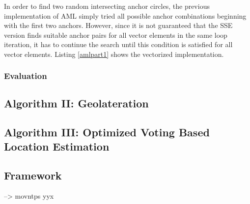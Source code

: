 
In order to find two random intersecting anchor circles, the previous implementation of AML simply tried all possible anchor combinations beginning with the first two anchors. However, since it is not guaranteed that the SSE version finds suitable anchor pairs for all vector elements in the same loop iteration, it has to continue the search until this condition is satisfied for all vector elements. Listing \ref{amlpart1} shows the vectorized implementation. 


\subsubsection{Evaluation}

\subsection{Algorithm II: Geolateration}
\subsection{Algorithm III: Optimized Voting Based Location Estimation}
\subsection{Framework}
--> movntps yyx